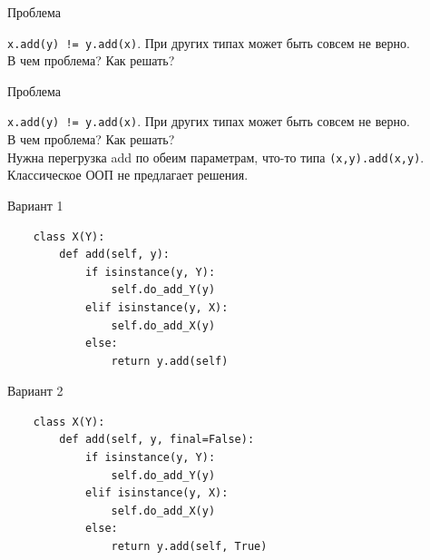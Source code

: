 \documentclass{article}
\begin{document}
\begin{center} Проблема \end{center}
    \lstinline|x.add(y) != y.add(x)|. При других типах может быть совсем не верно. \\
    В чем проблема? Как решать? \\
\newpage

\begin{center} Проблема \end{center}
    \lstinline|x.add(y) != y.add(x)|. При других типах может быть совсем не верно. \\
    В чем проблема? Как решать? \\
    Нужна перегрузка add по обеим параметрам, что-то типа
    \lstinline!(x,y).add(x,y)!.  Классическое ООП не предлагает решения.
\newpage

\begin{center} Вариант 1 \end{center}
\begin{lstlisting}
    class X(Y):
        def add(self, y):
            if isinstance(y, Y):
                self.do_add_Y(y)
            elif isinstance(y, X):
                self.do_add_X(y)
            else:
                return y.add(self)
\end{lstlisting}
\newpage

\begin{center} Вариант 2 \end{center}
\begin{lstlisting}
    class X(Y):
        def add(self, y, final=False):
            if isinstance(y, Y):
                self.do_add_Y(y)
            elif isinstance(y, X):
                self.do_add_X(y)
            else:
                return y.add(self, True)
\end{lstlisting}
\newpage
\end{document}
